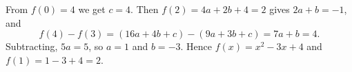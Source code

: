 From $f(0)=4$ we get $c=4$. Then $f(2)=4a+2b+4=2$ gives $2a+b=-1$, and
\[
f(4)-f(3)=(16a+4b+c)-(9a+3b+c)=7a+b=4 .
\]
Subtracting, $5a=5$, so $a=1$ and $b=-3$. Hence $f(x)=x^2-3x+4$ and $f(1)=1-3+4=\boxed{2}$.
